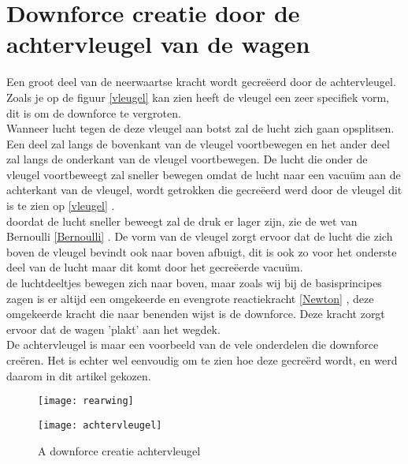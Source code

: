 \documentclass[a4paper,kulak]{kulakarticle} %
\begin{document}
\section{Downforce creatie door de achtervleugel van de wagen}

Een groot deel van de neerwaartse kracht wordt gecreëerd door de achtervleugel. Zoals je op de figuur \autoref{vleugel} kan zien heeft de vleugel een zeer specifiek vorm, dit is om de downforce te vergroten.
\\

Wanneer lucht tegen de deze vleugel aan botst zal de lucht zich gaan opsplitsen. Een deel zal langs de bovenkant van de vleugel voortbewegen en het ander deel zal langs de onderkant van de vleugel voortbewegen. De lucht die onder de vleugel voortbeweegt zal sneller bewegen omdat de lucht naar een vacuüm aan de achterkant van de vleugel, wordt getrokken die gecreëerd werd door de vleugel dit is te zien op \autoref{vleugel} .
\\

doordat de lucht sneller beweegt zal de druk er lager zijn, zie de wet van Bernoulli \ref{Bernoulli} . De vorm van de vleugel zorgt ervoor dat de lucht die zich boven de vleugel bevindt ook naar boven afbuigt, dit is ook zo voor het onderste deel van de lucht maar dit komt door het gecreëerde vacuüm.
\\

de luchtdeeltjes bewegen zich naar boven, maar zoals wij bij de basisprincipes zagen is er altijd een omgekeerde en evengrote reactiekracht \ref{Newton} , deze omgekeerde kracht die naar benenden wijst is de downforce. Deze kracht zorgt ervoor dat de wagen 'plakt' aan het wegdek. 
\\

De achtervleugel is maar een voorbeeld van de vele onderdelen die downforce creëren. Het is echter wel eenvoudig om te zien hoe deze gecreërd wordt, en werd daarom in dit artikel gekozen.
 







\begin{figure}[ht]
	\centering
	\begin{minipage}[b]{0.4\textwidth}
	\texttt{[image: rearwing]}
			
	\end{minipage}
	\hfill
	\begin{minipage}[b]{0.4\textwidth}
	\texttt{[image: achtervleugel]}
			
	\end{minipage}
	\caption{A downforce creatie achtervleugel \cite{zhang2006ground} \cite{taylor_2018}}
	\label{vleugel}
\end{figure}
\end{document}
